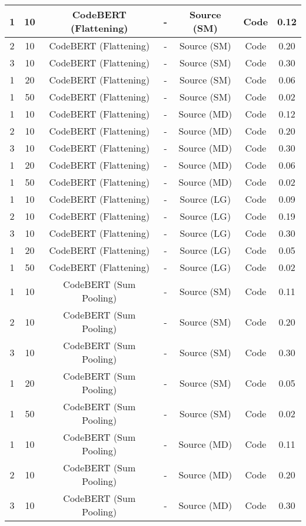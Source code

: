 \begin{longtable}{|c|c|c|c|c|c|c|}
\hline
1 & 10 & CodeBERT (Flattening) & - & Source (SM) & Code & 0.12 \\
\hline
2 & 10 & CodeBERT (Flattening) & - & Source (SM) & Code & 0.20 \\
\hline
3 & 10 & CodeBERT (Flattening) & - & Source (SM) & Code & 0.30 \\
\hline
1 & 20 & CodeBERT (Flattening) & - & Source (SM) & Code & 0.06 \\
\hline
1 & 50 & CodeBERT (Flattening) & - & Source (SM) & Code & 0.02 \\
\hline
1 & 10 & CodeBERT (Flattening) & - & Source (MD) & Code & 0.12 \\
\hline
2 & 10 & CodeBERT (Flattening) & - & Source (MD) & Code & 0.20 \\
\hline
3 & 10 & CodeBERT (Flattening) & - & Source (MD) & Code & 0.30 \\
\hline
1 & 20 & CodeBERT (Flattening) & - & Source (MD) & Code & 0.06 \\
\hline
1 & 50 & CodeBERT (Flattening) & - & Source (MD) & Code & 0.02 \\
\hline
1 & 10 & CodeBERT (Flattening) & - & Source (LG) & Code & 0.09 \\
\hline
2 & 10 & CodeBERT (Flattening) & - & Source (LG) & Code & 0.19 \\
\hline
3 & 10 & CodeBERT (Flattening) & - & Source (LG) & Code & 0.30 \\
\hline
1 & 20 & CodeBERT (Flattening) & - & Source (LG) & Code & 0.05 \\
\hline
1 & 50 & CodeBERT (Flattening) & - & Source (LG) & Code & 0.02 \\
\hline
1 & 10 & CodeBERT (Sum Pooling) & - & Source (SM) & Code & 0.11 \\
\hline
2 & 10 & CodeBERT (Sum Pooling) & - & Source (SM) & Code & 0.20 \\
\hline
3 & 10 & CodeBERT (Sum Pooling) & - & Source (SM) & Code & 0.30 \\
\hline
1 & 20 & CodeBERT (Sum Pooling) & - & Source (SM) & Code & 0.05 \\
\hline
1 & 50 & CodeBERT (Sum Pooling) & - & Source (SM) & Code & 0.02 \\
\hline
1 & 10 & CodeBERT (Sum Pooling) & - & Source (MD) & Code & 0.11 \\
\hline
2 & 10 & CodeBERT (Sum Pooling) & - & Source (MD) & Code & 0.20 \\
\hline
3 & 10 & CodeBERT (Sum Pooling) & - & Source (MD) & Code & 0.30 \\

\end{longtable}
